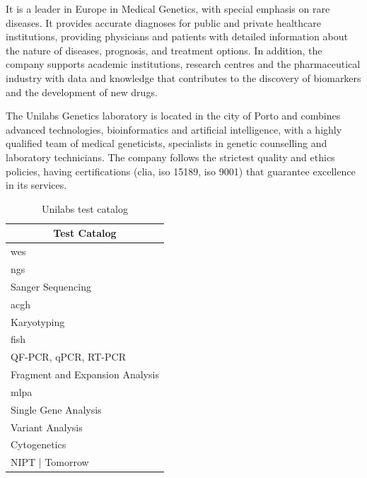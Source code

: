 It is a leader in Europe in Medical Genetics, with special emphasis on rare diseases. It provides accurate diagnoses for public and private healthcare institutions, providing physicians and patients with detailed information about the nature of diseases, prognosis, and treatment options. In addition, the company supports academic institutions, research centres and the pharmaceutical industry with data and knowledge that contributes to the discovery of biomarkers and the development of new drugs. 

The Unilabs Genetics laboratory is located in the city of Porto and combines advanced technologies, bioinformatics and artificial intelligence, with a highly qualified team of medical geneticists, specialists in genetic counselling and laboratory technicians. The company follows the strictest quality and ethics policies, having certifications (\ac{clia}, \ac{iso} 15189, \ac{iso} 9001) that guarantee excellence in its services. \cite{unilabs_genetica}


\begin{table}[H]
    \centering
    \caption{Unilabs test catalog}
    \label{tab:test_catalog}
    \begin{tabular}{@{}l@{}}
    \toprule
    \multicolumn{1}{c}{\textbf{Test Catalog}}               \\ \midrule
    \ac{wes}                                                \\
    \acl{ngs}                                               \\
    Sanger Sequencing                                       \\
    \ac{acgh}                                               \\
    Karyotyping                                             \\
    \ac{fish}                                               \\
    QF-PCR, qPCR, RT-PCR                                    \\
    Fragment and Expansion Analysis                         \\
    \ac{mlpa}                                               \\
    Single Gene Analysis                                    \\
    Variant Analysis                                        \\
    Cytogenetics                                            \\
    NIPT | Tomorrow                                         \\ \bottomrule
    \end{tabular}
    \end{table}
